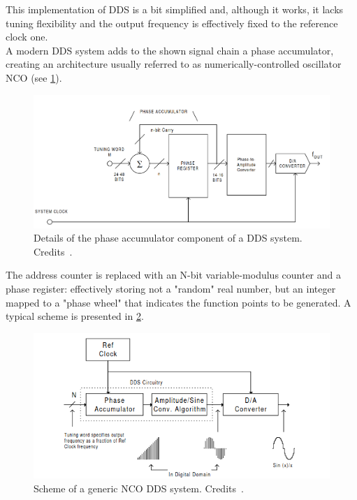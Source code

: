 This implementation of DDS is a bit simplified and, although it works, it lacks tuning flexibility and the output frequency is effectively fixed to the reference clock one.\\
A modern DDS system adds to the shown signal chain a phase accumulator, creating an architecture usually referred to as numerically-controlled oscillator NCO (see \cref{fig:phase_accumulator_DDS}).
\begin{figure}[ht]
    \centering
    \includegraphics[width=\textwidth]{Setup-software/figures/phase_accumulator_DDS.png}
    \caption[Details of the phase accumulator component of a DDS system]{Details of the phase accumulator component of a DDS system. Credits~\cite{DDS}.}
    \label{fig:phase_accumulator_DDS}
\end{figure}
The address counter is replaced with an N-bit variable-modulus counter and a phase register: effectively storing not a "random" real number, but an integer mapped to a "phase wheel" that indicates the function points to be generated. A typical scheme is presented in \cref{fig:DDS}.

\begin{figure}[ht]
    \centering
    \includegraphics[width=\textwidth]{Setup-software/figures/DDS.png}
    \caption[Scheme of a generic NCO DDS system]{Scheme of a generic NCO DDS system. Credits~\cite{DDS}.}
    \label{fig:DDS}
\end{figure}

